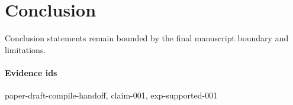 \section{Conclusion}
Conclusion statements remain bounded by the final manuscript boundary and limitations.

\paragraph{Evidence ids} paper-draft-compile-handoff, claim-001, exp-supported-001
